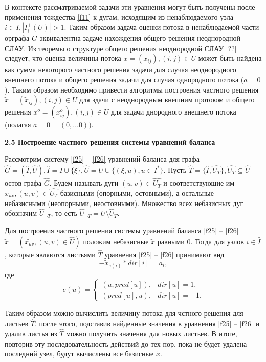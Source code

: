 \documentclass[14pt]{extarticle}%
\begin{document}
В контексте рассматриваемой задачи эти уравнения могут быть получены после применения тождества \eqref{f11} к дугам, исходящим из ненаблюдаемого узла $i\in I, |I^+_i(U)|>1$. Таким образом задача оценки потока в ненаблюдаемой части орграфа $G$ эквивалентна задаче нахождения общего решения неоднородной СЛАУ. Из теоремы о структуре общего решения неоднородной СЛАУ [??] следует, что оценка величины потока $x=(x_{ij}), (i,j)\in U$ может быть найдена как сумма некоторого частного решения задачи для случая неоднородного внешнего потока и общего решения задачи для случая однородного потока ($a=\overline{0}$). Таким образом необходимо привести алгоритмы построения частного решения $\widetilde{x}=(\widetilde{x}_{ij}), (i,j)\in U$ для здачи с неоднородным внешним протоком и общего решения $x^o=(x^o_{ij}), (i,j)\in U$ для задачи днородного внешнего потока (полагая $a=\overline{0}=(0, \ldots 0)$).

\textbf{2.5 Построение частного решения системы уравнений баланса}

Рассмотрим систему \eqref{f25} -- \eqref{f26} уравнений баланса для графа $\widehat{G}=(\widehat{I},\widehat{U}), \widehat{I}=I\cup\{\xi\}, \widehat{U}=U\cup\{(\xi,u),u\in I^*\}$. Пусть $\widehat{T}=\{\widehat{I},\widehat{U_T}\}, \widehat{U_T}\subseteq \widehat{U}$ --- остов графа $\widehat{G}$. Будем называть дуги $(u,v)\in \widehat{U_T}$ и соответствуюшие им $x_{uv}, (u,v)\in \widehat{U_T}$ базисными (опорными, остовными), а остальные --- небазисными (неопорными, неостовными). Множество всех небазисных дуг обозначим $\widehat{U}_{\neg T}$, то есть $\widehat{U}_{\neg T}=U\setminus \widehat{U}_T$. 

Для построения частного решения системы уравнений баланса \eqref{f25} -- \eqref{f26} $\widetilde x=(\widetilde{x_{uv}},(u,v)\in \widehat{U})$ положим небазисные $\widetilde{x}$ равными $0$. Тогда для узлов $i\in \widehat{I}$, которые являются листьями $\widehat{T}$ уравнения \eqref{f25} -- \eqref{f26} принимают вид 
\begin{equation}\label{f241}
-\widetilde{x}_{e(i)}*dir[i]=a_i,
\end{equation}
где 
\begin{equation*}
e(u)=\left\{
\begin{matrix}
(u, pred[u]),& dir[u]=1,\\
(pred[u],u),& dir[u]=-1.
\end{matrix}
\right.
\end{equation*}

Таким образом можно вычислить величину потока для чстного решения для листьев $\widehat{T}$. после этого, подставив найденные значения в уравнения \eqref{f25} -- \eqref{f26} и удалив листья из $\widehat{T}$ можно получить значения для новых листьев. В итоге, повторив эту последовательность действий до тех пор, пока не будет удалена последний узел, будут вычислены все базисные $\widetilde x$.
\end{document}
